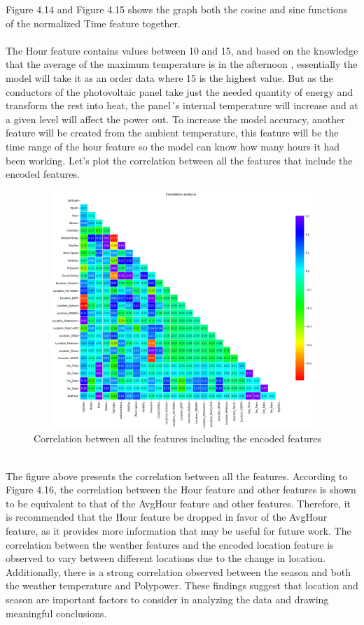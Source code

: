 \documentclass{report}
\begin{document}
Figure 4.14 and Figure 4.15 shows the graph both the cosine and sine functions of the normalized Time feature together.\\
\\
The Hour feature contains values between 10 and 15, and based on the knowledge that the average of the maximum temperature is in the afternoon , essentially the model will take it as an order data where 15 is the highest value. But as the conductors of the photovoltaic panel take just the needed quantity of energy and transform the rest into heat, the panel´s internal temperature will increase and at a given level will affect the power out. To increase the model accuracy, another feature will be created from the ambient temperature, this feature will be the time range of the hour feature so the model can know how many hours it had been working. Let's plot the correlation between all the features that include the encoded features. 
\begin{figure}[h!]
  \centering
    \includegraphics[width=14cm, height=9cm] {cf.png}
    \caption{Correlation between all the features including the encoded features}
    \label{fig:my_label}
\end{figure}
\hfill \break 
\\
The figure above presents the correlation between all the features. According to Figure 4.16, the correlation between the Hour feature and other features is shown to be equivalent to that of the AvgHour feature and other features. Therefore, it is recommended that the Hour feature be dropped in favor of the AvgHour feature, as it provides more information that may be useful for future work. The correlation between the weather features and the encoded location feature is observed to vary between different locations due to the change in location. Additionally, there is a strong correlation observed between the season and both the weather temperature and Polypower. These findings suggest that location and season are important factors to consider in analyzing the data and drawing meaningful conclusions.
\end{document}
